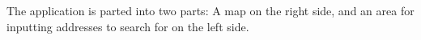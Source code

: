 The application is parted into two parts: A map on the right side, and an area for inputting addresses to search for on the left side.